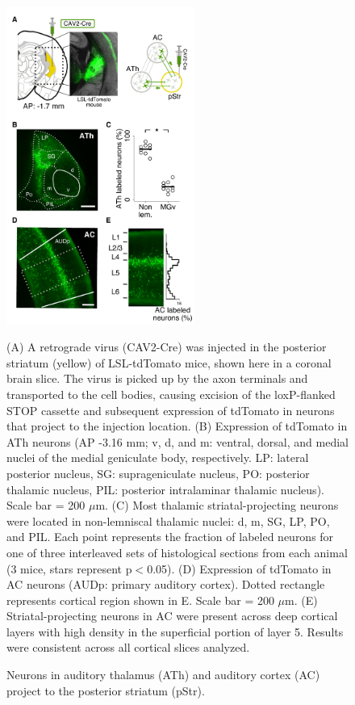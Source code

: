 \begin{figure}[hp]
  \begin{center}
    \includegraphics[height=4.1in]{figures/chapter3/fig1_anatomy}%
  \end{center}
\caption{Neurons in auditory thalamus (ATh) and auditory cortex (AC) project to the posterior striatum (pStr).}{(A) A retrograde virus (CAV2-Cre) was injected in the posterior striatum (yellow) of LSL-tdTomato mice, shown here in a coronal brain slice.  
%
The virus is picked up by the axon terminals and transported to the cell bodies, causing excision of the loxP-flanked STOP cassette and subsequent expression of tdTomato in neurons that project to the injection location. 
%
(B) Expression of tdTomato in ATh neurons (AP -3.16 mm; v, d, and m: ventral, dorsal, and medial nuclei of the medial geniculate body, respectively. LP: lateral posterior nucleus, SG: suprageniculate nucleus, PO: posterior thalamic nucleus, PIL: posterior intralaminar thalamic nucleus).
%
Scale bar = 200 $\mu$m. 
%
(C) Most thalamic striatal-projecting neurons were located in non-lemniscal thalamic nuclei: d, m, SG, LP, PO, and PIL. 
%
Each point represents the fraction of labeled neurons for one of three interleaved sets of histological sections from each animal (3 mice, stars represent p$<$0.05). 
%
(D) Expression of tdTomato in AC neurons (AUDp: primary auditory cortex). 
%
Dotted rectangle represents cortical region shown in E. Scale bar = 200 $\mu$m. 
%
(E) Striatal-projecting neurons in AC were present across deep cortical layers with high density in the superficial portion of layer 5.
%
Results were consistent across all cortical slices analyzed. 
}
\end{figure}


